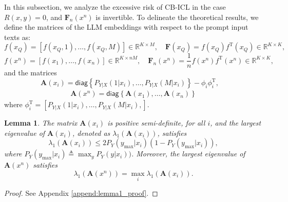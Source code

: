\documentclass{article} %
\theoremstyle{plain} %
\newtheorem{lemma}[theorem]{Lemma}          %
\begin{document}
In this subsection, we analyze the excessive risk of CB-ICL in the case $R(x,y)=0$, and $\mathbf{F}_n(x^n)$ is invertible. To delineate the theoretical results, we define the matrices of the LLM embeddings with respect to the prompt input texts as:
\begin{equation*}
    f(x_Q) = \left[ f(x_Q,1) , \ldots , f(x_Q,M)\right]
\in \mathbb R^{K \times M}, \quad \mathbf{F}(x_Q) = f(x_Q)f^\text{T}(x_Q)\in \mathbb R^{K \times K},
\end{equation*}
\begin{equation*}
    f(x^n) = \left[ f(x_1) , \ldots , f(x_n)\right]
\in \mathbb R^{K \times nM}, \quad \mathbf{F}_n(x^n) = \frac1n f(x^n)f^\text{T}(x^n) \in \mathbb R^{K \times K},
\end{equation*}
and the matrices
\begin{equation*}
    \textbf{A}(x_i) = \textsf{diag}\left\{ P_{Y|X}(1|x_i), \ldots, P_{Y|X}(M|x_i) \right\} - \phi_i\phi_i^{\text{T}},\quad 
\end{equation*}
\begin{align}\label{equ:def_Q}
\textbf{A}(x^n) = \textsf{diag}\left\{ \textbf{A}(x_1), \ldots, \textbf{A}(x_n) \right\}
\end{align}
where $\phi_i^{\text{T}} = \left[ P_{Y|X}(1|x_i), \ldots , P_{Y|X}(M|x_i) , \right]$.

\begin{lemma}\label{lem:lambda_1_ub}
The matrix $\textbf{A}(x_i)$ is positive semi-definite, for all $i$, and the largest eigenvalue of $\textbf{A}(x_i)$, denoted as $\lambda_1(\textbf{A}(x_i))$, satisfies
\begin{equation*}
    \lambda_1(\textbf{A}(x_i)) \leq 2P_Y(y_{\max}|x_i)\left(1-P_Y(y_{\max}|x_i)\right),
\end{equation*}
where $P_Y(y_{\max}|x_i) \triangleq \max_yP_Y(y|x_i))$. Moreover, the largest eigenvalue of $\textbf{A}(x^n)$ satisfies 
\begin{equation*}
    \lambda_1(\textbf{A}(x^n)) = \max_i\lambda_1(\textbf{A}(x_i)).
\end{equation*}
\end{lemma}
\begin{proof}
See Appendix \ref{append:lemma1_proof}.
\end{proof}
\end{document}
